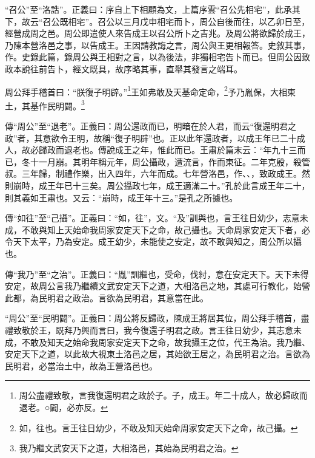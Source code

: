 {\noindent\shu{}\fzkt “召公”至“洛誥”。正義曰：序自上下相顧為文，上篇序雲“召公先相宅”，此承其下，故云“召公既相宅”。召公以三月戊申相宅而卜，周公自後而往，以乙卯日至，經營成周之邑。周公即遣使人來告成王以召公所卜之吉兆。及周公將欲歸於成王，乃陳本營洛邑之事，以告成王。王因請教誨之言，周公與王更相報答。史敘其事，作。史錄此篇，錄周公與王相對之言，以為後法，非獨相宅告卜而已。但周公因致政本說往前告卜，經文既具，故序略其事，直舉其發言之端耳。 \par}

周公拜手稽首曰：“朕復子明辟。”\footnote{周公盡禮致敬，言我復還明君之政於子。子，成王。年二十成人，故必歸政而退老。○闢，必亦反。}王如弗敢及天基命定命，\footnote{如，往也。言王往日幼少，不敢及知天始命周家安定天下之命，故己攝。}予乃胤保，大相東土，其基作民明闢。\footnote{我乃繼文武安天下之道，大相洛邑，其始為民明君之治。}


{\noindent\zhuan{}\fzbyks 傳“周公”至“退老”。正義曰：周公還政而已，明暗在於人君，而云“復還明君之政”者，其意欲令王明，故稱“復子明辟”也。正以此年還政者，以成王年已二十成人，故必歸政而退老也。傳說成王之年，惟此而已。王肅於篇末云：“年九十三而已，冬十一月崩。其明年稱元年，周公攝政，遭流言，作而東征。二年克殷，殺管叔。三年歸，制禮作樂，出入四年，六年而成。七年營洛邑，作、、，致政成王。然則崩時，成王年已十三矣。周公攝政七年，成王適滿二十。”孔於此言成王年二十，則其義如王肅也。又云：“崩時，成王年十三。”是孔之所據也。 \par}

{\noindent\zhuan{}\fzbyks 傳“如往”至“己攝”。正義曰：“如，往”，文。“及”訓與也，言王往日幼少，志意未成，不敢與知上天始命我周家安定天下之命，故己攝也。天命周家安定天下者，必令天下太平，乃為安定。成王幼少，未能使之安定，故不敢與知之，周公所以攝也。 \par}

{\noindent\zhuan{}\fzbyks 傳“我乃”至“之治”。正義曰：“胤”訓繼也，受命，伐紂，意在安定天下。天下未得安定，故周公言我乃繼續文武安定天下之道，大相洛邑之地，其處可行教化，始營此都，為民明君之政治。言欲為民明君，其意當在此。 \par}

{\noindent\shu{}\fzkt “周公”至“民明闢”。正義曰：周公將反歸政，陳成王將居其位，周公拜手稽首，盡禮致敬於王，既拜乃興而言曰，我今復還子明君之政。言王往日幼少，其志意未成，不敢及知天之始命我周家安定天下之命，故我攝王之位，代王為治。我乃繼、安定天下之道，以此故大視東土洛邑之居，其始欲王居之，為民明君之治。言欲為民明君，必當治土中，故為王營洛邑也。 \par}

